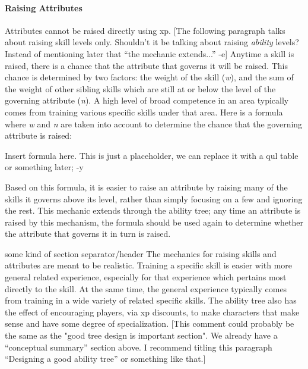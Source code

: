 \documentclass[12pt]{article}
\newcommand{\notes}[1]{{\color{Tan} #1}}
\begin{document}
\paragraph{Raising Attributes}
Attributes cannot be raised directly using xp.
\notes{[The following paragraph talks about raising skill levels only.
Shouldn't it be talking about raising \emph{ability} levels?
Instead of mentioning later that ``the mechanic extends...'' -e]}
Anytime a skill is raised, there is a chance that the attribute that governs it will be raised.
This chance is determined by two factors: the weight of the skill (\emph{w}), and the sum of the weight of other sibling skills which are still at or below the level of the governing attribute (\emph{n}).
A high level of broad competence in an area typically comes from training various specific skills under that area.
Here is a formula where \emph{w} and \emph{n} are taken into account to determine the chance that the governing attribute is raised:

\notes{Insert formula here. This is just a placeholder, we can replace it with a qul table or something later; -y}

Based on this formula, it is easier to raise an attribute by raising many of the skills it governs above its level, rather than simply focusing on a few and ignoring the rest. This mechanic extends through the ability tree; any time an attribute is raised by this mechanism, the formula should be used again to determine whether the attribute that governs it in turn is raised.

\notes{some kind of section separator/header} The mechanics for raising skills and attributes are meant to be realistic. Training a specific skill is easier with more general related experience, especially for that experience which pertains most directly to the skill. At the same time, the general experience typically comes from training in a wide variety of related specific skills. The ability tree also has the effect of encouraging players, via xp discounts, to make characters that make sense and have some degree of specialization.
\notes{[This comment could probably be the same as the "good tree design is important section".
We already have a ``conceptual summary'' section above.
I recommend titling this paragraph ``Designing a good ability tree'' or something like that.]}
\end{document}
